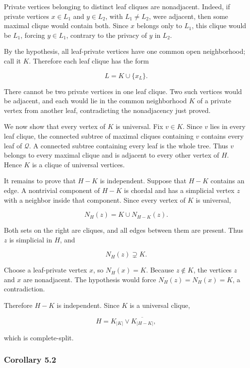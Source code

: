 \documentclass[
  11pt,
]{article}
\begin{document}
Private vertices belonging to distinct leaf cliques are nonadjacent.
Indeed, if private vertices \(x\in L_1\) and \(y\in L_2\), with
\(L_1\ne L_2\), were adjacent, then some maximal clique would contain
both. Since \(x\) belongs only to \(L_1\), this clique would be \(L_1\),
forcing \(y\in L_1\), contrary to the privacy of \(y\) in \(L_2\).

By the hypothesis, all leaf-private vertices have one common open
neighborhood; call it \(K\). Therefore each leaf clique has the form

\[
L=K\cup\{x_L\}.
\]

There cannot be two private vertices in one leaf clique. Two such
vertices would be adjacent, and each would lie in the common
neighborhood \(K\) of a private vertex from another leaf, contradicting
the nonadjacency just proved.

We now show that every vertex of \(K\) is universal. Fix \(v\in K\).
Since \(v\) lies in every leaf clique, the connected subtree of maximal
cliques containing \(v\) contains every leaf of \(\mathcal Q\). A
connected subtree containing every leaf is the whole tree. Thus \(v\)
belongs to every maximal clique and is adjacent to every other vertex of
\(H\). Hence \(K\) is a clique of universal vertices.

It remains to prove that \(H-K\) is independent. Suppose that \(H-K\)
contains an edge. A nontrivial component of \(H-K\) is chordal and has a
simplicial vertex \(z\) with a neighbor inside that component. Since
every vertex of \(K\) is universal,

\[
N_H(z)=K\cup N_{H-K}(z).
\]

Both sets on the right are cliques, and all edges between them are
present. Thus \(z\) is simplicial in \(H\), and

\[
N_H(z)\supsetneq K.
\]

Choose a leaf-private vertex \(x\), so \(N_H(x)=K\). Because
\(z\notin K\), the vertices \(z\) and \(x\) are nonadjacent. The
hypothesis would force \(N_H(z)=N_H(x)=K\), a contradiction.

Therefore \(H-K\) is independent. Since \(K\) is a universal clique,

\[
H=K_{|K|}\vee\overline{K_{|H-K|}},
\]

which is complete-split.

\subsubsection{Corollary 5.2}\label{corollary-5.2}
\end{document}
